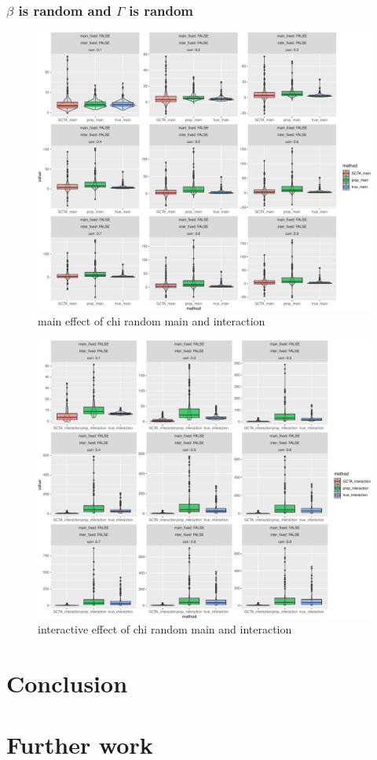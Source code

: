 \documentclass[]{article}
\begin{document}
\clearpage

\subsubsection{\texorpdfstring{\(\beta\) is random and \(\Gamma\) is
random}{\textbackslash{}beta is random and \textbackslash{}Gamma is random}}\label{beta-is-random-and-gamma-is-random-1}

\begin{figure}
\centering
\includegraphics{Simulation_report_files/figure-latex/main_random_random_chi-1.pdf}
\caption{main effect of chi random main and interaction}
\end{figure}

\begin{figure}
\centering
\includegraphics{Simulation_report_files/figure-latex/inter_random_random_chi-1.pdf}
\caption{interactive effect of chi random main and interaction}
\end{figure}

\section{Conclusion}\label{conclusion}

\section{Further work}\label{further-work}
\end{document}
